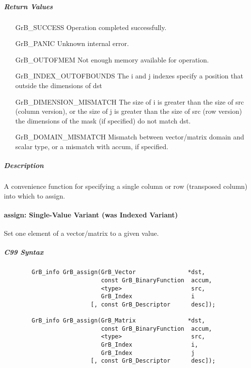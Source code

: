 \subparagraph{Return Values}

\begin{itemize}[leftmargin=2.1in]
\item[{\sf GrB\_SUCCESS}]             Operation completed successfully.
\item[{\sf GrB\_PANIC}]               Unknown internal error.
\item[{\sf GrB\_OUTOFMEM}]            Not enough memory available for operation.
\item[{\sf GrB\_INDEX\_OUTOFBOUNDS}]  The i and j indexes specify a position that outside the dimensions of dst
\item[{\sf GrB\_DIMENSION\_MISMATCH}] 
        The size of {\sf i} is greater than the size of {\sf src} (column version), or
        the size of {\sf j} is greater than the size of {\sf src} (row version)
        the dimensions of the mask (if specified) do not match {\sf dst}.
\item[{\sf GrB\_DOMAIN\_MISMATCH}]    Mismatch between vector/matrix domain and scalar type,
                                      or a mismatch with {\sf accum}, if specified.
\end{itemize}

\subparagraph{Description}

A convenience function for specifying a single column or row (transposed column) into which to assign.


\paragraph{{\sf assign}: Single-Value Variant (was Indexed Variant)}

Set one element of a vector/matrix to a given value.

\subparagraph{C99 Syntax}

\begin{verbatim}
        GrB_info GrB_assign(GrB_Vector               *dst,
                            const GrB_BinaryFunction  accum,
                            <type>                    src,
                            GrB_Index                 i
                         [, const GrB_Descriptor      desc]); 

        GrB_info GrB_assign(GrB_Matrix               *dst,
                            const GrB_BinaryFunction  accum,
                            <type>                    src,
                            GrB_Index                 i,
                            GrB_Index                 j
                         [, const GrB_Descriptor      desc]); 
\end{verbatim}

